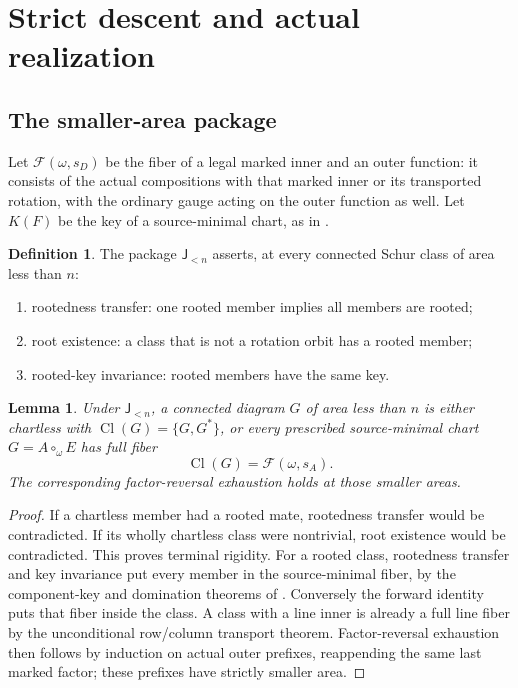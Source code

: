 \documentclass[11pt,a4paper]{amsart}
\numberwithin{equation}{section}
\theoremstyle{plain}
\newtheorem{lemma}[theorem]{Lemma}
\theoremstyle{definition}
\newtheorem{definition}[theorem]{Definition}
\newcommand{\Cl}{\operatorname{Cl}}
\newcommand{\Jlower}{\mathsf J_{<n}}
\begin{document}
\section{Strict descent and actual realization}\label{sec:descent}

\subsection{The smaller-area package}

Let \(\mathcal F(\omega,s_D)\) be the fiber of a legal marked inner and an outer
function: it consists of the actual compositions with that marked inner or
its transported rotation, with the ordinary gauge acting on the outer
function as well.  Let \(K(F)\) be the key of a source-minimal chart, as in
\cite{Shields2026Gluing}.

\begin{definition}\label{def:joint}
The package \(\Jlower\) asserts, at every connected Schur class of area less
than \(n\):
\begin{enumerate}
\item rootedness transfer: one rooted member implies all members are rooted;
\item root existence: a class that is not a rotation orbit has a rooted member;
\item rooted-key invariance: rooted members have the same key.
\end{enumerate}
\end{definition}

\begin{lemma}\label{lem:lower-full}
Under \(\Jlower\), a connected diagram \(G\) of area less than \(n\) is either
chartless with \(\Cl(G)=\{G,G^*\}\), or every prescribed source-minimal chart
\(G=A\circ_\omega E\) has full fiber
\[
 \Cl(G)=\mathcal F(\omega,s_A).
\]
The corresponding factor-reversal exhaustion holds at those smaller areas.
\end{lemma}
\begin{proof}
If a chartless member had a rooted mate, rootedness transfer would be
contradicted.  If its wholly chartless class were nontrivial, root existence
would be contradicted.  This proves terminal rigidity.  For a rooted class,
rootedness transfer and key invariance put every member in the source-minimal
fiber, by the component-key and domination theorems of
\cite{Shields2026Gluing}.  Conversely the forward identity puts that fiber
inside the class.  A class with a line inner is already a full line fiber by
the unconditional row/column transport theorem.  Factor-reversal exhaustion
then follows by induction on actual outer prefixes, reappending the same
last marked factor; these prefixes have strictly smaller area.
\end{proof}
\end{document}
